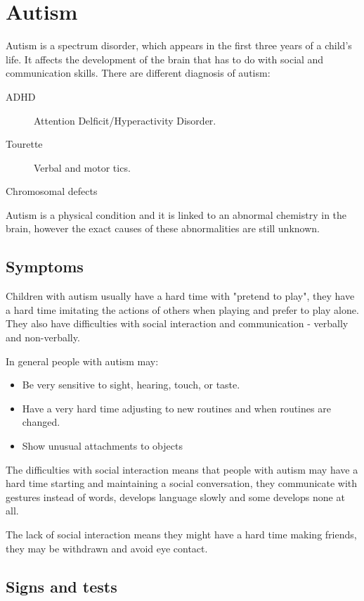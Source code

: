 \section{Autism}

Autism is a spectrum disorder, which appears in the first three years of a child's life. It affects the development of the brain that has to do with social and communication skills. There are different diagnosis of autism:

\begin{description}
\item[ADHD] Attention Delficit/Hyperactivity Disorder.
\item[Tourette] Verbal and motor tics.
\item[Chromosomal defects]
\end{description}

Autism is a physical condition and it is linked to an abnormal chemistry in the brain, however the exact causes of these abnormalities are still unknown. 

\subsection*{Symptoms} 

Children with autism usually have a hard time with "pretend to play", they have a hard time imitating the actions of others when playing and prefer to play alone. They also have difficulties with social interaction and communication - verbally and non-verbally. 

In general people with autism may:

\begin{itemize}
\item Be very sensitive to sight, hearing, touch, or taste.
\item Have a very hard time adjusting to new routines and when routines are changed.
\item Show unusual attachments to objects
\end{itemize} 

The difficulties with social interaction means that people with autism may have a hard time starting and maintaining a social conversation, they communicate with gestures instead of words, develops language slowly and some develops none at all. 

The lack of social interaction means they might have a hard time making friends, they may be withdrawn and avoid eye contact. 

\subsection*{Signs and tests}

